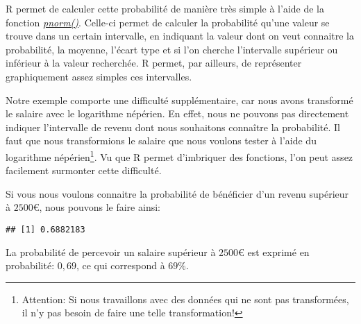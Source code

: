 \documentclass[
]{book}
\newenvironment{Shaded}{\begin{snugshade}}{\end{snugshade}}
\newcommand{\AttributeTok}[1]{\textcolor[rgb]{0.77,0.63,0.00}{#1}}
\newcommand{\CommentTok}[1]{\textcolor[rgb]{0.56,0.35,0.01}{\textit{#1}}}
\newcommand{\DecValTok}[1]{\textcolor[rgb]{0.00,0.00,0.81}{#1}}
\newcommand{\FunctionTok}[1]{\textcolor[rgb]{0.00,0.00,0.00}{#1}}
\newcommand{\NormalTok}[1]{#1}
\newcommand{\SpecialCharTok}[1]{\textcolor[rgb]{0.00,0.00,0.00}{#1}}
\begin{document}
R permet de calculer cette probabilité de manière très simple à l'aide de la fonction \href{https://www.rdocumentation.org/packages/stats/versions/3.6.2/topics/Normal}{\emph{pnorm()}}. Celle-ci permet de calculer la probabilité qu'une valeur se trouve dans un certain intervalle, en indiquant la valeur dont on veut connaitre la probabilité, la moyenne, l'écart type et si l'on cherche l'intervalle supérieur ou inférieur à la valeur recherchée. R permet, par ailleurs, de représenter graphiquement assez simples ces intervalles.

Notre exemple comporte une difficulté supplémentaire, car nous avons transformé le salaire avec le logarithme népérien. En effet, nous ne pouvons pas directement indiquer l'intervalle de revenu dont nous souhaitons connaître la probabilité. Il faut que nous transformions le salaire que nous voulons tester à l'aide du logarithme népérien\footnote{Attention: Si nous travaillons avec des données qui ne sont pas transformées, il n'y pas besoin de faire une telle transformation!}. Vu que R permet d'imbriquer des fonctions, l'on peut assez facilement surmonter cette difficulté.

Si vous nous voulons connaitre la probabilité de bénéficier d'un revenu supérieur à \(2500€\), nous pouvons le faire ainsi:

\begin{Shaded}
\end{Shaded}

\begin{verbatim}
## [1] 0.6882183
\end{verbatim}

La probabilité de percevoir un salaire supérieur à \(2500€\) est exprimé en probabilité: \(0,69\), ce qui correspond à \(69\%\).
\end{document}
